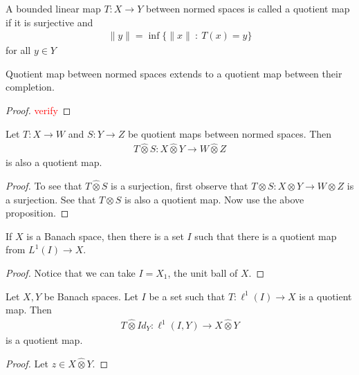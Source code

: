 

\begin{definition}
  A bounded linear map $T: X \to Y$ between normed spaces is called a
  quotient map if it is surjective and
  \begin{align*}
    \|y\| = \inf \{ \|x\|  \ : \ T(x) = y \}
  \end{align*}
  for all $y \in Y$
\end{definition}

\begin{proposition}
  Quotient map between normed spaces extends to a quotient map between
  their completion.
\end{proposition}
\begin{proof}
  \textcolor{red}{verify}
\end{proof}

\begin{theorem}
  Let $T : X \to W$ and $S: Y \to Z$ be quotient maps between normed
  spaces. Then
  \begin{align*}
    T \hat{\otimes} S : X \hat{\otimes} Y \to W \hat{\otimes} Z
  \end{align*}
  is also a quotient map.
\end{theorem}
\begin{proof}
  To see that $T \hat{\otimes} S$ is a surjection, first observe that
  $T \otimes S : X \otimes Y \to W \otimes Z$ is a surjection.
  See that $ T \otimes S$ is also a quotient map. Now use the above proposition.
\end{proof}

\begin{note}
  If $X$ is a Banach space, then there is a set $I$ such that there
  is a quotient map from $L^{1}(I) \to X$.
\end{note}
\begin{proof}
  Notice that we can take $I = X_1$, the unit ball of $X$.
\end{proof}

\begin{proposition}
  Let $X, Y $ be Banach spaces. Let $I$ be a set such that $T:
  \ell^{1}(I) \to X$ is a quotient map. Then
  \begin{align*}
    T \hat{\otimes} Id_Y : \ell^{1}(I, Y) \to X \hat{\otimes} Y
  \end{align*}
  is a quotient map.
\end{proposition}
\begin{proof}
  Let $z \in X \hat{\otimes} Y$.
\end{proof}
